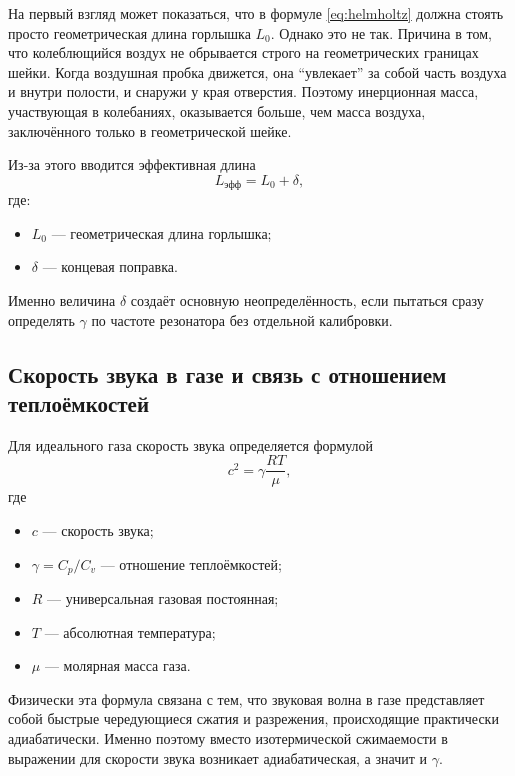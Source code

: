 \documentclass[a4paper,12pt]{article}
\begin{document}
	На первый взгляд может показаться, что в формуле \eqref{eq:helmholtz} должна стоять просто геометрическая длина горлышка \(L_0\). Однако это не так. Причина в том, что колеблющийся воздух не обрывается строго на геометрических границах шейки. Когда воздушная пробка движется, она ``увлекает'' за собой часть воздуха и внутри полости, и снаружи у края отверстия. Поэтому инерционная масса, участвующая в колебаниях, оказывается больше, чем масса воздуха, заключённого только в геометрической шейке.
	
	Из-за этого вводится эффективная длина
	\begin{equation}
		L_{\text{эфф}}=L_0+\delta,
		\label{eq:Leff}
	\end{equation}
	где:
	\begin{itemize}
		\item \(L_0\) --- геометрическая длина горлышка;
		\item \(\delta\) --- концевая поправка.
	\end{itemize}
	
	Именно величина \(\delta\) создаёт основную неопределённость, если пытаться сразу определять \(\gamma\) по частоте резонатора без отдельной калибровки.
	
	\subsection{Скорость звука в газе и связь с отношением теплоёмкостей}
	
	Для идеального газа скорость звука определяется формулой
	\begin{equation}
		c^2=\gamma \frac{RT}{\mu},
		\label{eq:sound}
	\end{equation}
	где
	\begin{itemize}
		\item \(c\) --- скорость звука;
		\item \(\gamma=C_p/C_v\) --- отношение теплоёмкостей;
		\item \(R\) --- универсальная газовая постоянная;
		\item \(T\) --- абсолютная температура;
		\item \(\mu\) --- молярная масса газа.
	\end{itemize}
	
	Физически эта формула связана с тем, что звуковая волна в газе представляет собой быстрые чередующиеся сжатия и разрежения, происходящие практически адиабатически. Именно поэтому вместо изотермической сжимаемости в выражении для скорости звука возникает адиабатическая, а значит и \(\gamma\).
	
\end{document}
